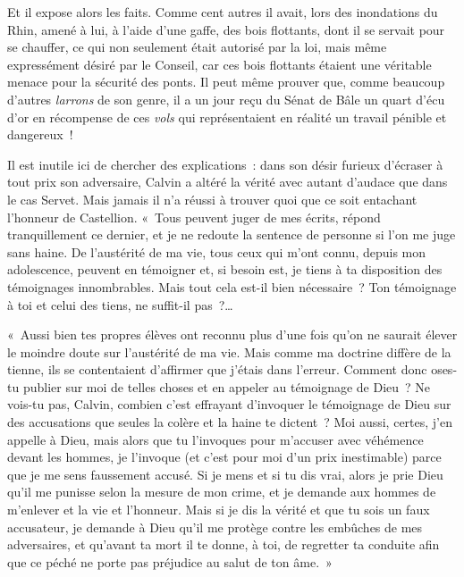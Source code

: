 \documentclass[french,twoside]{book} %
\newenvironment{quoteblock}%
  {\begin{quoting}}
  {\end{quoting}}
\newenvironment{quotebar}{%
    \def\FrameCommand{{\color{rubric!10!}\vrule width 0.5em} \hspace{0.9em}}%
    \def\OuterFrameSep{2pt} %
    \MakeFramed {\advance\hsize-\width \FrameRestore}
  }%
  {%
    \endMakeFramed
  }
\renewenvironment{quoteblock}%
  {%
    \savenotes
    \setstretch{0.9}
    \normalfont
    \begin{quotebar}
  }
  {%
    \end{quotebar}
    \spewnotes
  }
\begin{document}
\noindent Et il expose alors les faits. Comme cent autres il avait, lors des inondations du Rhin, amené à lui, à l’aide d’une gaffe, des bois flottants, dont il se servait pour se chauffer, ce qui non seulement était autorisé par la loi, mais même expressément désiré par le Conseil, car ces bois flottants étaient une véritable menace pour la sécurité des ponts. Il peut même prouver que, comme beaucoup d’autres \emph{larrons} de son genre, il a un jour reçu du Sénat de Bâle un quart d’écu d’or en récompense de ces \emph{vols} qui représentaient en réalité un travail pénible et dangereux !\par
Il est inutile ici de chercher des explications : dans son désir furieux d’écraser à tout prix son adversaire, Calvin a altéré la vérité avec autant d’audace que dans le cas Servet. Mais jamais il n’a réussi à trouver quoi que ce soit entachant l’honneur de Castellion. « Tous peuvent juger de mes écrits, répond tranquillement ce dernier, et je ne redoute la sentence de personne si l’on me juge sans haine. De l’austérité de ma vie, tous ceux qui m’ont connu, depuis mon adolescence, peuvent en témoigner et, si besoin est, je tiens à ta disposition des témoignages innombrables. Mais tout cela est-il bien nécessaire ? Ton témoignage à toi et celui des tiens, ne suffit-il pas ?…\par

\begin{quoteblock}
\noindent « Aussi bien tes propres élèves ont reconnu plus d’une fois qu’on ne saurait élever le moindre doute sur l’austérité de ma vie. Mais comme ma doctrine diffère de la tienne, ils se contentaient d’affirmer que j’étais dans l’erreur. Comment donc oses-tu publier sur moi de telles choses et en appeler au témoignage de Dieu ? Ne vois-tu pas, Calvin, combien c’est effrayant d’invoquer le témoignage de Dieu sur des accusations que seules la colère et la haine te dictent ? Moi aussi, certes, j’en appelle à Dieu, mais alors que tu l’invoques pour m’accuser avec véhémence devant les hommes, je l’invoque (et c’est pour moi d’un prix inestimable) parce que je me sens faussement accusé. Si je mens et si tu dis vrai, alors je prie Dieu qu’il me punisse selon la mesure de mon crime, et je demande aux hommes de m’enlever et la vie et l’honneur. Mais si je dis la vérité et que tu sois un faux accusateur, je demande à Dieu qu’il me protège contre les embûches de mes adversaires, et qu’avant ta mort il te donne, à toi, de regretter ta conduite afin que ce péché ne porte pas préjudice au salut de ton âme. »\end{quoteblock}
\end{document}
